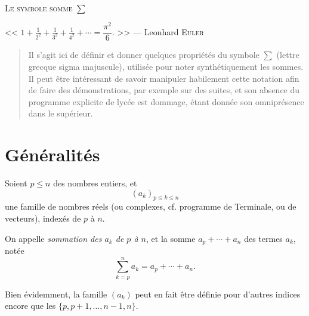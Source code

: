 \documentclass[twoside,12pt]{article}
\theoremstyle{definition}
\theoremstyle{remark}
\theoremstyle{plain}
\begin{document}
\begin{center}
	\hrulefill\\
    \vspace{6mm}
	\textsc{\LARGE Le symbole somme $\displaystyle\sum$}\\
    \vspace{3mm}
    \hrulefill
\end{center}
\vspace{1cm}

\begin{flushright}
<< $\displaystyle 1 + \frac{1}{2^2} + \frac{1}{3^2} + \frac{1}{4^2 } + \cdots = \dfrac{\pi^2}{6}. $ >> — Leonhard \textsc{Euler}
\end{flushright}

\begin{abstract}
Il s'agit ici de définir et donner quelques propriétés du symbole $\sum$ (lettre grecque sigma majuscule), utilisée pour noter synthétiquement les sommes. Il peut être intéressant de savoir manipuler habilement cette notation afin de faire des démonstrations, par exemple sur des suites, et son absence du programme explicite de lycée est dommage, étant donnée son omniprésence dans le supérieur.
\end{abstract}

\section{Généralités}

\begin{defn}[Sommation]\leavevmode
Soient $p\leq n$ des nombres entiers, et \[(a_k)_{p\leq k\leq n}\] une famille de nombres réels (ou complexes, cf. programme de Terminale, ou de vecteurs), indexés de $p$ à $n$.

On appelle \textit{sommation des $a_k$ de $p$ à $n$}, et la somme $a_p+\cdots+a_n$ des termes $a_k$, notée
\[ \sum_{k=p}^n a_k = a_p + \cdots + a_n. \]
\end{defn}

\begin{rem}
Bien évidemment, la famille $(a_k)$ peut en fait être définie pour d'autres indices encore que les $\{p,p+1,\ldots,n-1,n \}$.
\end{rem}
\end{document}
